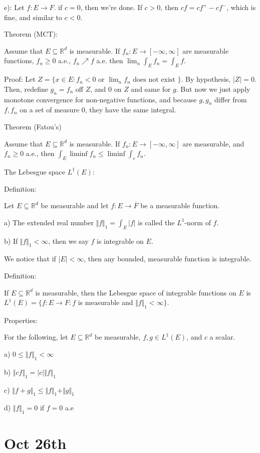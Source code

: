 \documentclass[10pt]{article}
\begin{document}
e): Let $f: E \to F$. if $c = 0$, then we’re done. If $c > 0$, then $cf = cf^+ - cf^-$, which is fine, and similar to $c < 0$.

Theorem (MCT):

Assume that $E \subseteq \mathbb{R}^d$ is measurable. If $f_n: E \to [-\infty,\infty]$ are measurable functions, $f_n \geq 0$ a.e., $f_n \nearrow f$ a.e. then $\lim_n \int_E f_n = \int_E f$.

Proof: Let $Z = \{ x \in E : f_n < 0 \text{ or } \lim_n f_n \text{ does not exist } \}$. By hypothesis, $|Z| = 0$. Then, redefine $g_n = f_n$ off $Z$, and $0$ on $Z$ and same for $g$. But now we just apply monotone convergence for non-negative functions, and because $g, g_n$ differ from $f,f_n$ on a set of measure 0, they have the same integral.

Theorem (Fatou’s)

Assume that $E \subseteq \mathbb{R}^d$ is measurable. If $f_n: E \to [-\infty,\infty]$ are measurable, and $f_n \geq 0$ a.e., then $\int_E \liminf f_n \leq \liminf \int_e f_n$.

The Lebesgue space $L^1(E)$:

Definition:

Let $E \subseteq \mathbb{R}^d$ be measurable and let $f : E \to \overline{F}$ be a measurable function.

a) The extended real number $\Vert f \Vert_1 = \int_E |f|$ is called the $L^1$-norm of $f$.

b) If $\Vert f \Vert_1 < \infty$, then we say $f$ is integrable on $E$.

We notice that if $|E| < \infty$, then any bounded, measurable function is integrable.

Definition:

If $E \subseteq \mathbb{R}^d$ is measurable, then the Lebesgue space of integrable functions on $E$ is $L^1(E) = \{ f: E \to F : f$ is measurable and $\Vert f \Vert_1 < \infty \}$.

Properties:

For the following, let $E \subseteq \mathbb{R}^d$ be measurable, $f,g \in L^1(E)$, and $c$ a scalar.

a) $0 \leq \Vert f \Vert_1 < \infty$

b) $\Vert cf \Vert_1 = |c| \Vert f \Vert_1$

c) $\Vert f + g \Vert_1 \leq \Vert f \Vert_1 + \Vert g \Vert_1$

d) $\Vert f \Vert_1 = 0$ if $ f = 0$ a.e

\section*{Oct 26th}
\end{document}
